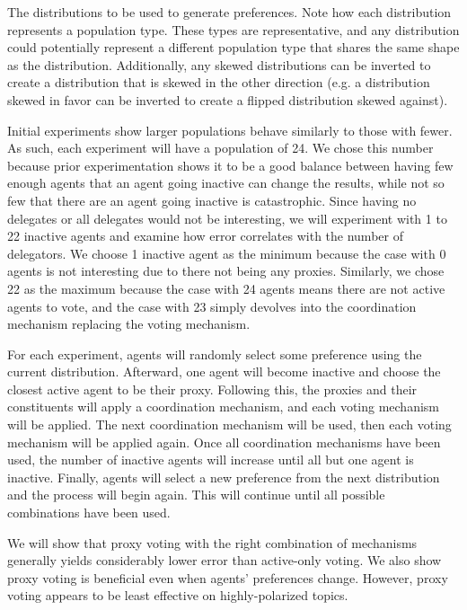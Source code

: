 \begin{table}[!htbp]
    \renewcommand{\arraystretch}{1.3}

    \caption{
        The distributions to be used to generate preferences.
        Note how each distribution represents a population type.
        These types are representative, and any distribution could potentially
        represent a different population type that shares the same shape as the
        distribution.
        Additionally, any skewed distributions can be inverted to create a
        distribution that is skewed in the other direction (e.g. a distribution
        skewed in favor can be inverted to create a flipped distribution skewed
        against).
    }
    \label{tab:distributions-used}

    \centering
    
\end{table}

Initial experiments show larger populations behave similarly to those with fewer.
As such, each experiment will have a population of 24.
We chose this number because prior experimentation shows it to be a good balance
between having few enough agents that an agent going inactive can change the
results, while not so few that there are an agent going inactive is catastrophic.
Since having no delegates or all delegates would not be interesting, we will
experiment with 1 to 22 inactive agents and examine how error correlates with
the number of delegators.
We choose 1 inactive agent as the minimum because the case with 0 agents is not
interesting due to there not being any proxies.
Similarly, we chose 22 as the maximum because the case with 24 agents means there are
not active agents to vote, and the case with 23 simply devolves into the coordination
mechanism replacing the voting mechanism.

For each experiment, agents will randomly select some preference using the current
distribution.
Afterward, one agent
will become inactive and choose the closest active agent to be their proxy.
Following this, the proxies and their constituents will apply a coordination
mechanism, and each voting mechanism will be applied.
The next coordination mechanism will be used, then each voting mechanism will be
applied again.
Once all coordination mechanisms have been used, the number of inactive agents will
increase until all but one agent is inactive.
Finally, agents will select a new preference from the next distribution and the
process will begin again.
This will continue until all possible combinations have been used.

We will show that proxy voting with the right combination of mechanisms generally
yields considerably lower error than active-only voting.
We also show proxy voting is beneficial even when agents' preferences change.
However, proxy voting appears to be least effective on highly-polarized topics.
